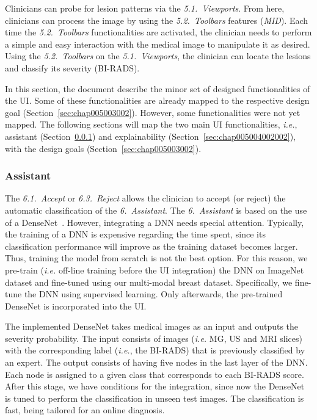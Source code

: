 Clinicians can probe for lesion patterns via the {\it 5.1.~Viewports}.
From here, clinicians can process the image by using the {\it 5.2.~Toolbars} features ({\it MID}).
Each time the {\it 5.2.~Toolbars} functionalities are activated, the clinician needs to perform a simple and easy interaction with the medical image to manipulate it as desired.
Using the {\it 5.2.~Toolbars} on the {\it 5.1.~Viewports}, the clinician can locate the lesions and classify its severity (\ac{BI-RADS}).

In this section, the document describe the minor set of designed functionalities of the \ac{UI}.
Some of these functionalities are already mapped to the respective design goal (Section~\ref{sec:chap005003002}).
However, some functionalities were not yet mapped.
The following sections will map the two main \ac{UI} functionalities, {\it i.e.}, assistant (Section~\ref{sec:chap005004002001}) and explainability (Section~\ref{sec:chap005004002002}), with the design goals (Section~\ref{sec:chap005003002}).

\subsubsection{Assistant}
\label{sec:chap005004002001}

The {\it 6.1.~Accept} or {\it 6.3.~Reject} allows the clinician to accept (or reject) the automatic classification of the {\it 6.~Assistant}.
The {\it 6.~Assistant} is based on the use of a DenseNet~\cite{Huang_2017_CVPR}.
However, integrating a \ac{DNN} needs special attention.
Typically, the training of a \ac{DNN} is expensive regarding the time spent, since its classification performance will improve as the training dataset becomes larger.
Thus, training the model from scratch is not the best option.
For this reason, we pre-train ({\it i.e.} off-line training before the \ac{UI} integration) the \ac{DNN} on ImageNet~\cite{10.1145/3351095.3375709} dataset and fine-tuned using our multi-modal breast dataset.
Specifically, we fine-tune the \ac{DNN} using supervised learning.
Only afterwards, the pre-trained DenseNet is incorporated into the \ac{UI}.

The implemented DenseNet takes medical images as an input and outputs the severity probability.
The input consists of images ({\it i.e.} \ac{MG}, \ac{US} and \ac{MRI} slices) with the corresponding label ({\it i.e.}, the \ac{BI-RADS}) that is previously classified by an expert.
The output consists of having five nodes in the last layer of the \ac{DNN}.
Each node is assigned to a given class that corresponds to each \ac{BI-RADS} score.
After this stage, we have conditions for the integration, since now the DenseNet is tuned to perform the classification in unseen test images.
The classification is fast, being tailored for an online diagnosis.

